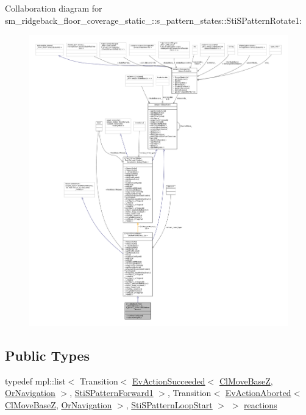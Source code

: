 Collaboration diagram for sm\+\_\+ridgeback\+\_\+floor\+\_\+coverage\+\_\+static\+\_\+:\+:s\+\_\+pattern\+\_\+states\+:\+:Sti\+S\+Pattern\+Rotate1\+:
\nopagebreak
\begin{figure}[H]
\begin{center}
\leavevmode
\includegraphics[width=350pt]{structsm__ridgeback__floor__coverage__static__1_1_1s__pattern__states_1_1StiSPatternRotate1__coll__graph}
\end{center}
\end{figure}
\subsection*{Public Types}
\begin{DoxyCompactItemize}
\item 
typedef mpl\+::list$<$ Transition$<$ \hyperlink{structsmacc_1_1default__events_1_1EvActionSucceeded}{Ev\+Action\+Succeeded}$<$ \hyperlink{classcl__move__base__z_1_1ClMoveBaseZ}{Cl\+Move\+BaseZ}, \hyperlink{classsm__ridgeback__floor__coverage__static__1_1_1OrNavigation}{Or\+Navigation} $>$, \hyperlink{structsm__ridgeback__floor__coverage__static__1_1_1s__pattern__states_1_1StiSPatternForward1}{Sti\+S\+Pattern\+Forward1} $>$, Transition$<$ \hyperlink{structsmacc_1_1default__events_1_1EvActionAborted}{Ev\+Action\+Aborted}$<$ \hyperlink{classcl__move__base__z_1_1ClMoveBaseZ}{Cl\+Move\+BaseZ}, \hyperlink{classsm__ridgeback__floor__coverage__static__1_1_1OrNavigation}{Or\+Navigation} $>$, \hyperlink{structsm__ridgeback__floor__coverage__static__1_1_1s__pattern__states_1_1StiSPatternLoopStart}{Sti\+S\+Pattern\+Loop\+Start} $>$ $>$ \hyperlink{structsm__ridgeback__floor__coverage__static__1_1_1s__pattern__states_1_1StiSPatternRotate1_aa472ba623b51853ad10f46786e874c4b}{reactions}
\end{DoxyCompactItemize}
